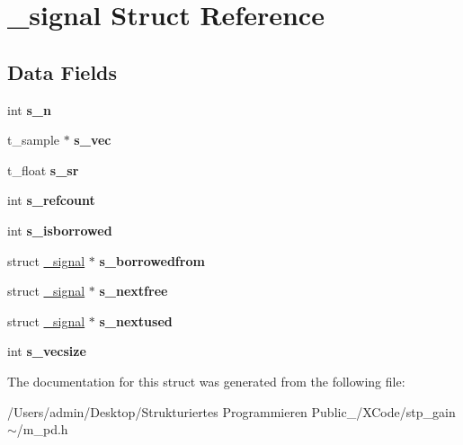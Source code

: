 \hypertarget{struct__signal}{}\section{\+\_\+signal Struct Reference}
\label{struct__signal}
\subsection*{Data Fields}
\begin{DoxyCompactItemize}
\item 
\mbox{\label{struct__signal_aee0a45e5329caef59b617145b09fc3fa}} 
int {\bfseries s\+\_\+n}
\item 
\mbox{\label{struct__signal_ad4ecec8b90444188a47a8cde0babc5ae}} 
t\+\_\+sample $\ast$ {\bfseries s\+\_\+vec}
\item 
\mbox{\label{struct__signal_a8ba1138e0b981e66f0f8bf5d43acc167}} 
t\+\_\+float {\bfseries s\+\_\+sr}
\item 
\mbox{\label{struct__signal_a42a0b1e2d910862e122c6f7d405487f5}} 
int {\bfseries s\+\_\+refcount}
\item 
\mbox{\label{struct__signal_a211530a9874e7c762db5ed3331af114d}} 
int {\bfseries s\+\_\+isborrowed}
\item 
\mbox{\label{struct__signal_af3c568b7265404de9c4fc354806b885e}} 
struct \hyperlink{struct__signal}{\+\_\+signal} $\ast$ {\bfseries s\+\_\+borrowedfrom}
\item 
\mbox{\label{struct__signal_a1563a6d75e23f0d92b8842c5523a069e}} 
struct \hyperlink{struct__signal}{\+\_\+signal} $\ast$ {\bfseries s\+\_\+nextfree}
\item 
\mbox{\label{struct__signal_a80b00e740f17b23928cba11f8f0a7c6a}} 
struct \hyperlink{struct__signal}{\+\_\+signal} $\ast$ {\bfseries s\+\_\+nextused}
\item 
\mbox{\label{struct__signal_a769a509c26775c6ff747d1a1f3326456}} 
int {\bfseries s\+\_\+vecsize}
\end{DoxyCompactItemize}


The documentation for this struct was generated from the following file\+:\begin{DoxyCompactItemize}
\item 
/\+Users/admin/\+Desktop/\+Strukturiertes Programmieren Public\+\_/\+X\+Code/stp\+\_\+gain$\sim$/m\+\_\+pd.\+h\end{DoxyCompactItemize}
